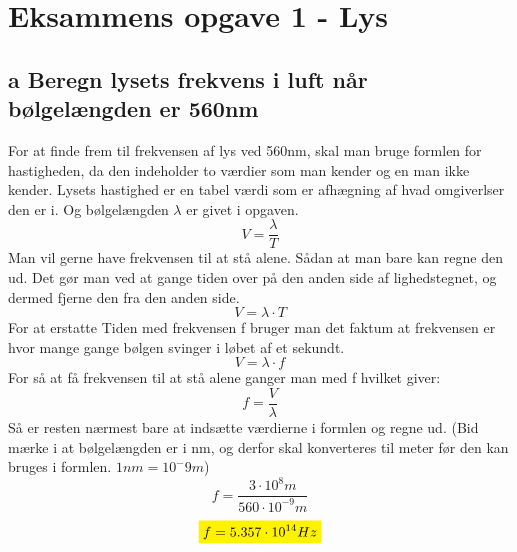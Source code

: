 \section{Eksammens opgave 1 - Lys}\label{sec:eks1}
\subsection{a Beregn lysets frekvens i luft når bølgelængden er 560nm}
For at finde frem til frekvensen af lys ved 560nm, skal man bruge formlen for hastigheden, da den indeholder to værdier som man kender og en man ikke kender. Lysets hastighed er en tabel værdi som er afhægning af hvad omgiverlser den er i. Og bølgelængden \begin{math}\lambda\end{math} er givet i opgaven.
\begin{equation*}
    V=\frac{\lambda}{T}
\end{equation*}
Man vil gerne have frekvensen til at stå alene. Sådan at man bare kan regne den ud. Det gør man ved at gange tiden over på den anden side af lighedstegnet, og dermed fjerne den fra den anden side. 
\begin{equation*}
    V=\lambda\cdot T
\end{equation*}
For at erstatte Tiden med frekvensen f bruger man det faktum at frekvensen er hvor mange gange bølgen svinger i løbet af et sekundt.
\begin{equation*}
    V=\lambda \cdot f 
\end{equation*}
For så at få frekvensen til at stå alene ganger man med f hvilket giver:
\begin{equation*}
    f=\frac{V}{\lambda}
\end{equation*}
Så er resten nærmest bare at indsætte værdierne i formlen og regne ud. (Bid mærke i at bølgelængden er i nm, og derfor skal konverteres til meter før den kan bruges i formlen. \begin{math}1 nm=10^-9m\end{math})
\begin{equation*}
    f=\frac{3 \cdot 10^8 m}{560 \cdot 10^{-9} m}
\end{equation*}
\textbf{\begin{equation*}
    \mathcolorbox{yellow}{f=5.357 \cdot 10^{14} Hz}
\end{equation*}}
